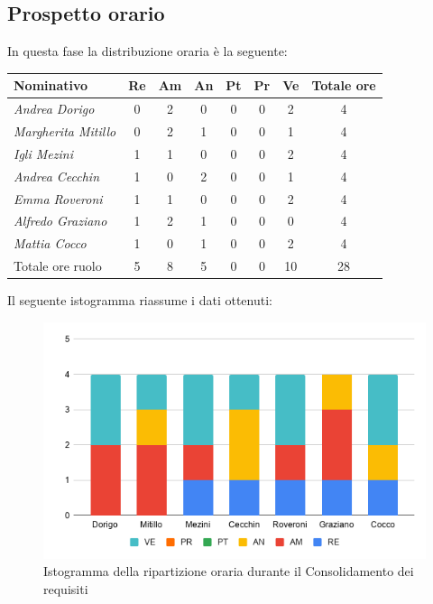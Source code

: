 {{\subsection{Prospetto orario}\label{PreventivoFaseDiConsolidamentoDeiRequisitiProspettoOrario}
In questa fase la distribuzione oraria è la seguente:
\quad
\def\tabularxcolumn#1{m{#1}}
{

	\begin{center}
		\renewcommand{\arraystretch}{1.4}
		\begin{tabularx}{\textwidth}{|X|c|c|c|c|c|c|c|}
			\hline
			\rowcolor{airforceblue}
			\textbf{Nominativo} & \textbf{Re} & \textbf{Am} & \textbf{An} & \textbf{Pt} & \textbf{Pr} & \textbf{Ve} & \textbf{Totale ore}\\
			\hline
			\textit{Andrea Dorigo} & 0 & 2 & 0 & 0 & 0 & 2 & 4\\
			\hline
			\textit{Margherita Mitillo} & 0 & 2 & 1 & 0 & 0 & 1 & 4\\
			\hline
			\textit{Igli Mezini} & 1 & 1 & 0 & 0 & 0 & 2 & 4\\
			\hline
			\textit{Andrea Cecchin} & 1 & 0 & 2 & 0 & 0 & 1 & 4\\
			\hline
			\textit{Emma Roveroni} & 1 & 1 & 0 & 0 & 0 & 2 & 4\\
			\hline
			\textit{Alfredo Graziano} & 1 & 2 & 1 & 0 & 0 & 0 & 4\\
			\hline
			\textit{Mattia Cocco} & 1 & 0 & 1 & 0 & 0 & 2 & 4\\
			\hline
			Totale ore ruolo & 5 & 8 & 5 & 0 & 0 & 10 & 28\\
			\hline
		\end{tabularx}
	\end{center}
Il seguente istogramma riassume i dati ottenuti:
\begin{figure}[!ht]
	\begin{center}
		\includegraphics[width=0.7\linewidth]{../immagini/pdp/istogramma_consolidamento_requisiti.png}
		\caption{Istogramma della ripartizione oraria durante il Consolidamento dei requisiti
}
	\end{center}
\end{figure}

}}}
